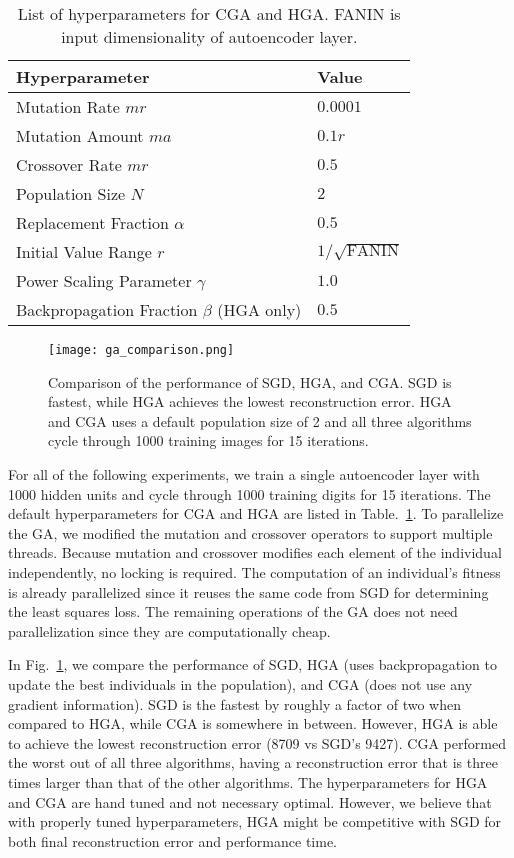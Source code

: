 \begin{table}[h]
  \centering
\begin{tabular}{l|l}
Hyperparameter     & Value                                                          \\ \hline
Mutation Rate $mr$ & $0.0001$ \\
Mutation Amount $ma$ & $0.1r$ \\
Crossover Rate $mr$ & $0.5$ \\
Population Size $N$ & $2$ \\
Replacement Fraction $\alpha$ & $0.5$ \\
Initial Value Range $r$ & $1/\sqrt{\text{FANIN}}$ \\
Power Scaling Parameter $\gamma$ & $1.0$ \\
Backpropagation Fraction $\beta$ (HGA only) & $0.5$ \\ 

\end{tabular}
\caption{List of hyperparameters for CGA and HGA. FANIN is input dimensionality of autoencoder layer.}
\label{tab:hyperparameters}
\end{table}

\begin{figure}[h] \centering
  \texttt{[image: ga\_comparison.png]}
  \caption{Comparison of the performance of SGD, HGA, and CGA. SGD is fastest, while HGA achieves the lowest reconstruction error. HGA and CGA uses a default population size of 2 and all three algorithms cycle through 1000 training images for 15 iterations.}
  \label{fig:ga_comparison}
\end{figure}

For all of the following experiments, we train a single autoencoder layer with 1000 hidden units and cycle through 1000 training digits for 15 iterations. The default hyperparameters for CGA and HGA are listed in Table.~\ref{tab:hyperparameters}. To parallelize the GA, we modified the mutation and crossover operators to support multiple threads. Because mutation and crossover modifies each element of the individual independently, no locking is required. The computation of an individual's fitness is already parallelized since it reuses the same code from SGD for determining the least squares loss. The remaining operations of the GA does not need parallelization since they are computationally cheap. 

In Fig.~\ref{fig:ga_comparison}, we compare the performance of SGD, HGA (uses backpropagation to update the best individuals in the population), and CGA (does not use any gradient information). SGD is the fastest by roughly a factor of two when compared to HGA, while CGA is somewhere in between. However, HGA is able to achieve the lowest reconstruction error (8709 vs SGD's 9427). CGA performed the worst out of all three algorithms, having a reconstruction error that is three times larger than that of the other algorithms. The hyperparameters for HGA and CGA are hand tuned and not necessary optimal. However, we believe that with properly tuned hyperparameters, HGA might be competitive with SGD for both final reconstruction error and performance time. 

